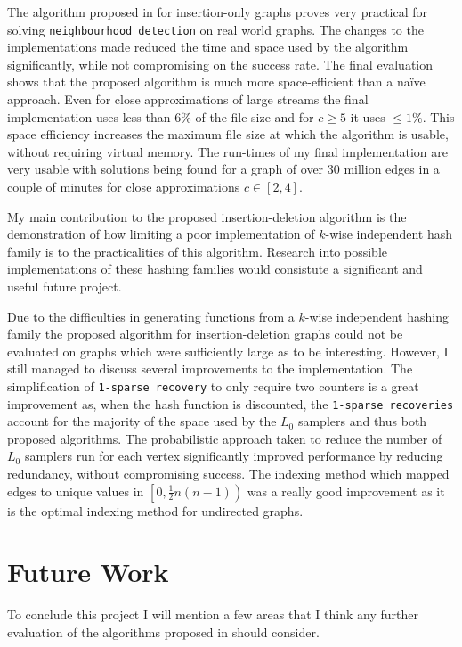 \documentclass[11pt,twoside,a4paper]{report}
\begin{document}
The algorithm proposed in \cite{orig} for insertion-only graphs proves very practical for solving \texttt{neighbourhood detection} on real world graphs. The changes to the implementations made reduced the time and space used by the algorithm significantly, while not compromising on the success rate. The final evaluation shows that the proposed algorithm is much more space-efficient than a naïve approach. Even for close approximations of large streams the final implementation uses less than $6\%$ of the file size and for $c\geq5$ it uses $\leq1\%$. This space efficiency increases the maximum file size at which the algorithm is usable, without requiring virtual memory. The run-times of my final implementation are very usable with solutions being found for a graph of over 30 million edges in a couple of minutes for close approximations $c\in[2,4]$.
\par My main contribution to the proposed insertion-deletion algorithm is the demonstration of how limiting a poor implementation of $k$-wise independent hash family is to the practicalities of this algorithm. Research into possible implementations of these hashing families would consistute a significant and useful future project.
\par Due to the difficulties in generating functions from a $k$-wise independent hashing family the proposed algorithm for insertion-deletion graphs could not be evaluated on graphs which were sufficiently large as to be interesting. However, I still managed to discuss several improvements to the implementation. The simplification of \texttt{1-sparse recovery} to only require two counters is a great improvement as, when the hash function is discounted, the \texttt{1-sparse recoveries} account for the majority of the space used by the $L_0$ samplers and thus both proposed algorithms. The probabilistic approach taken to reduce the number of $L_0$ samplers run for each vertex significantly improved performance by reducing redundancy, without compromising success. The indexing method which mapped edges to unique values in $\left[0,\frac12n(n-1)\right)$ was a really good improvement as it is the optimal indexing method for undirected graphs.

\section{Future Work}

To conclude this project I will mention a few areas that I think any further evaluation of the algorithms proposed in \cite{orig} should consider.
\end{document}
